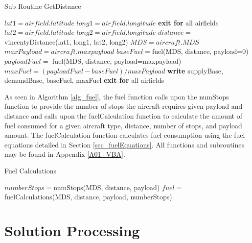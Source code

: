 \begin{algorithm}[H]
\caption{Sub Routine GetDistance}
\label{alg_getDistance}
\begin{algorithmic}
          	\State $lat1=airfield.latitude$
            \State $long1=airfield.longitude$
            \State \textbf{exit for} all airfields
        \EndIf
	\EndFor
				\State $lat2=airfield.latitude$
            	\State $long2=airfield.longitude$
                \State $distance=$ vincentyDistance(lat1, long1, lat2, long2)
                	\State $MDS= aircraft.MDS$
                    \State $maxPayload=aircraft.maxpayload$
					\State $baseFuel=$fuel(MDS, distance, payload=0)
					\State $payloadFuel=$ fuel(MDS, distance, payload=maxpayload)
					\State $maxFuel= (payloadFuel-baseFuel)/maxPayload$
                	\State \textbf{write} supplyBase, demandBase, baseFuel, maxFuel 
                \EndFor
                \State \textbf{exit for} all airfields
        	\EndIf
      	\EndFor
	\EndFor
 \EndFor
\end{algorithmic}
\end{algorithm}
As seen in Algorithm \ref{alg_fuel}, the fuel function calls upon the numStops function to provide the number of stops the aircraft requires given payload and distance and calls upon the fuelCalculation function to calculate the amount of fuel consumed for a given aircraft type, distance, number of stops, and payload amount. The fuelCalculation function calculates fuel consumption using the fuel equations detailed in Section \ref{sec_fuelEquations}. All functions and subroutines may be found in Appendix \ref{A01_VBA}. 
\begin{algorithm}[H]
\caption{Fuel Calculations}
\label{alg_fuel}
\begin{algorithmic}
	\State $numberStops = $numStops(MDS, distance, payload)
    \State $fuel = $fuelCalculations(MDS, distance, payload, numberStops)
\EndFunction
\end{algorithmic}
\end{algorithm}

\section{Solution Processing} \label{sec_solutionProcessing}

